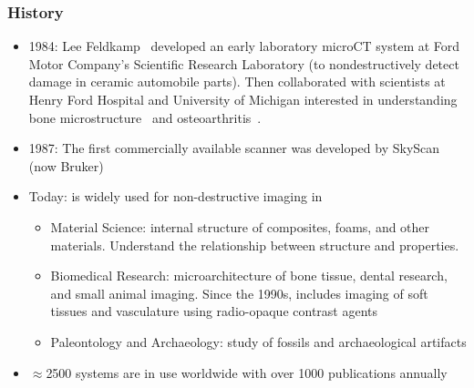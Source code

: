 \begin{frame}
		\frametitle{\uct History}
		\begin{itemize}
				\item 1984: Lee Feldkamp~\cite{Feldkamp1984} developed an early laboratory microCT system at Ford Motor Company’s Scientific Research Laboratory (to nondestructively detect damage in ceramic automobile parts).
						Then collaborated with scientists at Henry Ford Hospital and University of Michigan interested in understanding bone microstructure~\cite{Feldkamp1989} and osteoarthritis~\cite{Layton1988}.
				\item 1987: The first commercially available \uct scanner was developed by SkyScan (now Bruker)
				\item Today: \uct is widely used for non-destructive imaging in
						\begin{itemize}
								\item Material Science: internal structure of composites, foams, and other materials.
										Understand the relationship between structure and properties.
								\item Biomedical Research: microarchitecture of bone tissue, dental research, and small animal imaging. Since the 1990s, \uct includes imaging of soft tissues and vasculature using radio-opaque contrast agents
								\item Paleontology and Archaeology: study of fossils and archaeological artifacts
						\end{itemize}
				\item \(\approx\)\num{2500} \uct systems are in use worldwide with over \num{1000} publications annually
		\end{itemize}
\end{frame}

